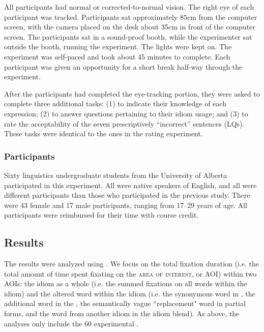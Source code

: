\documentclass[output=paper
,modfonts
,nonflat]{langsci/langscibook}
\begin{document}
All participants had normal or corrected-to-normal vision. The right eye of each participant was tracked. Participants sat approximately 85cm from the computer screen, with the camera placed on the desk about 35cm in front of the computer screen. The participants sat in a sound-proof booth, while the experimenter sat outside the booth, running the experiment. The lights were kept on. The experiment was self-paced and took about 45 minutes to complete. Each participant was given an opportunity for a short break half-way through the experiment.

After the participants had completed the eye-tracking portion, they were asked to complete three additional tasks: (1) to indicate their knowledge of each expression; (2) to answer questions pertaining to their idiom  usage; and (3) to rate the acceptability of the seven prescriptively ``incorrect'' sentences (LQs). These tasks were identical to the ones in the  rating experiment.



\subsubsection{Participants}

Sixty linguistics undergraduate students from the University of Alberta participated in this experiment. All were native speakers of English, and all were different participants than those who participated in the previous study. There were 43 female and 17 male participants, ranging from 17--29 years of age. All participants were reimbursed for their time with course credit.



\subsection{Results}

The results were analyzed using . We focus on the total fixation duration (i.e. the total amount of time spent fixating on the \textsc{area of interest}, or AOI) within two AOIs: the idiom as a whole (i.e. the summed fixations on all words within the idiom) and the altered word within the idiom (i.e. the synonymous word in , the additional word in the , the semantically vague ``replacement" word in partial forms,  and the word from another idiom in the idiom blend).  As above, the analyses only include the 60 experimental . %
\end{document}
